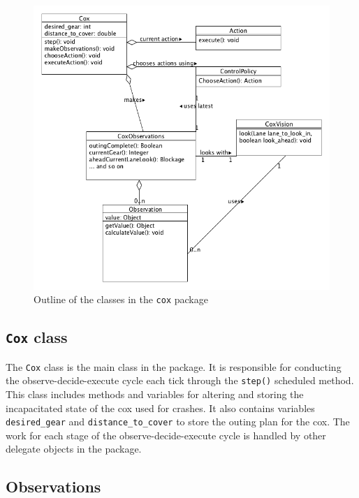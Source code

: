 \begin{figure}
\begin{center}
  \includegraphics[scale=0.45]{images/coxpackageUML.png}
  \caption{Outline of the classes in the \texttt{cox} package}
  \label{software:fig:coxUML}
\end{center}
\end{figure}

\subsection{\texttt{Cox} class}

The \texttt{Cox} class is the main class in the package. It is responsible for conducting the observe-decide-execute cycle each tick through the \texttt{step()} scheduled method. This class includes methods and variables for altering and storing the incapacitated state of the cox used for crashes. It also contains variables \texttt{desired\_gear} and \texttt{distance\_to\_cover} to store the outing plan for the cox. The work for each stage of the observe-decide-execute cycle is handled by other delegate objects in the package.

\subsection{Observations}

